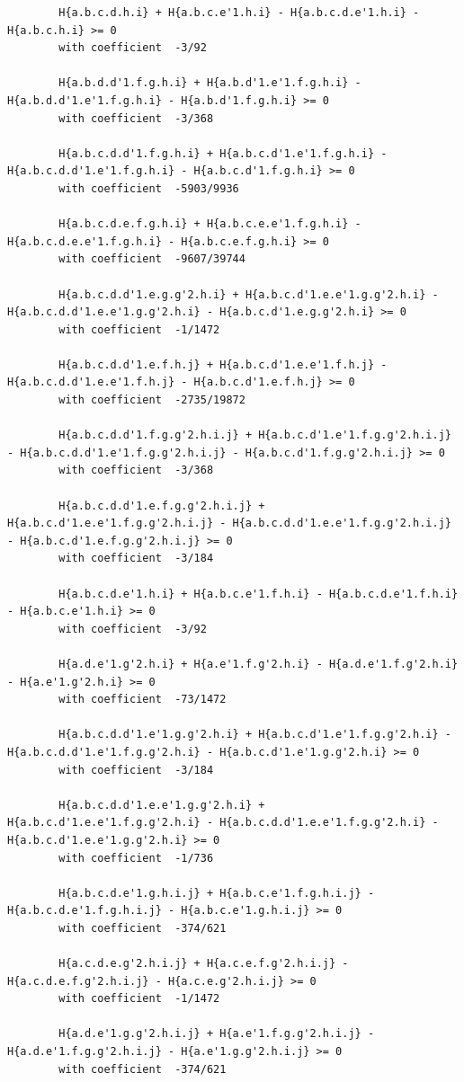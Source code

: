 \documentclass[11pt, a4paper]{kybernetika}
\begin{document}
\begin{verbatim}
		H{a.b.c.d.h.i} + H{a.b.c.e'1.h.i} - H{a.b.c.d.e'1.h.i} - H{a.b.c.h.i} >= 0
		with coefficient  -3/92
		
		H{a.b.d.d'1.f.g.h.i} + H{a.b.d'1.e'1.f.g.h.i} - H{a.b.d.d'1.e'1.f.g.h.i} - H{a.b.d'1.f.g.h.i} >= 0
		with coefficient  -3/368
		
		H{a.b.c.d.d'1.f.g.h.i} + H{a.b.c.d'1.e'1.f.g.h.i} - H{a.b.c.d.d'1.e'1.f.g.h.i} - H{a.b.c.d'1.f.g.h.i} >= 0
		with coefficient  -5903/9936
		
		H{a.b.c.d.e.f.g.h.i} + H{a.b.c.e.e'1.f.g.h.i} - H{a.b.c.d.e.e'1.f.g.h.i} - H{a.b.c.e.f.g.h.i} >= 0
		with coefficient  -9607/39744
		
		H{a.b.c.d.d'1.e.g.g'2.h.i} + H{a.b.c.d'1.e.e'1.g.g'2.h.i} - H{a.b.c.d.d'1.e.e'1.g.g'2.h.i} - H{a.b.c.d'1.e.g.g'2.h.i} >= 0
		with coefficient  -1/1472
		
		H{a.b.c.d.d'1.e.f.h.j} + H{a.b.c.d'1.e.e'1.f.h.j} - H{a.b.c.d.d'1.e.e'1.f.h.j} - H{a.b.c.d'1.e.f.h.j} >= 0
		with coefficient  -2735/19872
		
		H{a.b.c.d.d'1.f.g.g'2.h.i.j} + H{a.b.c.d'1.e'1.f.g.g'2.h.i.j} - H{a.b.c.d.d'1.e'1.f.g.g'2.h.i.j} - H{a.b.c.d'1.f.g.g'2.h.i.j} >= 0
		with coefficient  -3/368
		
		H{a.b.c.d.d'1.e.f.g.g'2.h.i.j} + H{a.b.c.d'1.e.e'1.f.g.g'2.h.i.j} - H{a.b.c.d.d'1.e.e'1.f.g.g'2.h.i.j} - H{a.b.c.d'1.e.f.g.g'2.h.i.j} >= 0
		with coefficient  -3/184
		
		H{a.b.c.d.e'1.h.i} + H{a.b.c.e'1.f.h.i} - H{a.b.c.d.e'1.f.h.i} - H{a.b.c.e'1.h.i} >= 0
		with coefficient  -3/92
		
		H{a.d.e'1.g'2.h.i} + H{a.e'1.f.g'2.h.i} - H{a.d.e'1.f.g'2.h.i} - H{a.e'1.g'2.h.i} >= 0
		with coefficient  -73/1472
		
		H{a.b.c.d.d'1.e'1.g.g'2.h.i} + H{a.b.c.d'1.e'1.f.g.g'2.h.i} - H{a.b.c.d.d'1.e'1.f.g.g'2.h.i} - H{a.b.c.d'1.e'1.g.g'2.h.i} >= 0
		with coefficient  -3/184
		
		H{a.b.c.d.d'1.e.e'1.g.g'2.h.i} + H{a.b.c.d'1.e.e'1.f.g.g'2.h.i} - H{a.b.c.d.d'1.e.e'1.f.g.g'2.h.i} - H{a.b.c.d'1.e.e'1.g.g'2.h.i} >= 0
		with coefficient  -1/736
		
		H{a.b.c.d.e'1.g.h.i.j} + H{a.b.c.e'1.f.g.h.i.j} - H{a.b.c.d.e'1.f.g.h.i.j} - H{a.b.c.e'1.g.h.i.j} >= 0
		with coefficient  -374/621
		
		H{a.c.d.e.g'2.h.i.j} + H{a.c.e.f.g'2.h.i.j} - H{a.c.d.e.f.g'2.h.i.j} - H{a.c.e.g'2.h.i.j} >= 0
		with coefficient  -1/1472
		
		H{a.d.e'1.g.g'2.h.i.j} + H{a.e'1.f.g.g'2.h.i.j} - H{a.d.e'1.f.g.g'2.h.i.j} - H{a.e'1.g.g'2.h.i.j} >= 0
		with coefficient  -374/621
		

\end{verbatim}
\end{document}
